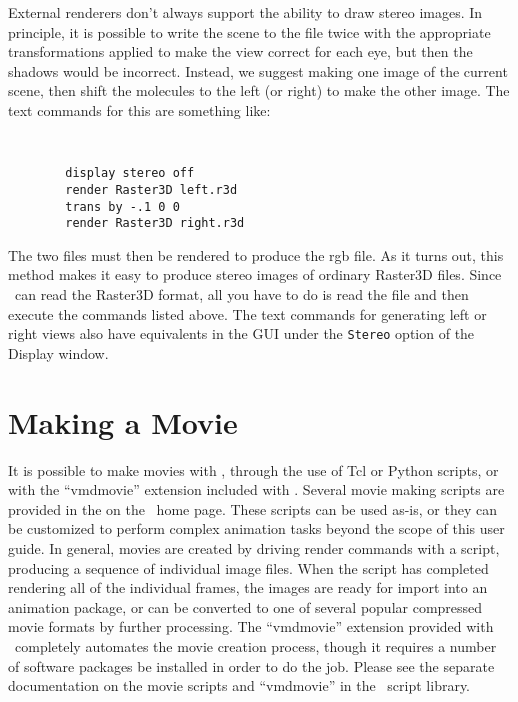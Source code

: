 External renderers don't always support the ability to draw stereo images.  
In principle, it is possible to write the scene to the file twice with the
appropriate transformations applied to make the view correct for each
eye, but then the shadows would be incorrect.
Instead, we suggest making one image of the current scene, then shift
the molecules to the left (or right) to make the other image.  
The text commands for this are something like:
{\tt
\begin{verbatim}
        display stereo off
        render Raster3D left.r3d
        trans by -.1 0 0
        render Raster3D right.r3d
\end{verbatim}
}
\noindent The two files must then be rendered to produce the rgb file.
As it turns out, this method makes it easy to produce stereo images of
ordinary Raster3D files.  Since \VMD\ can read the Raster3D format,
all you have to do is read the file and then execute the commands listed
above.  The text commands for generating left or right views also have
equivalents in the GUI under the {\tt Stereo} option of the Display window.


\section{Making a Movie}
It is possible to make movies with \VMD, through the use of Tcl or Python
scripts, or with the ``vmdmovie'' extension included with \VMD.
Several movie making scripts are provided in the 
on the \VMD\ home page.  These scripts can be used as-is, or they can
be customized to perform complex animation tasks beyond the scope of
this user guide.  In general, movies are created by driving
render commands with a script, producing a sequence of individual
image files.  When the script has completed rendering all of the 
individual frames, the images are ready for import into an
animation package, or can be converted to one of several popular
compressed movie formats by further processing.  The ``vmdmovie'' 
extension provided with \VMD\ completely automates the movie creation
process, though it requires a number of software packages be installed
in order to do the job.  Please see the separate documentation on the 
movie scripts and ``vmdmovie'' in the \VMD\ script library.


